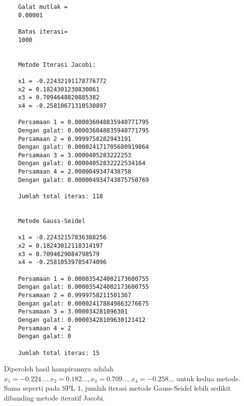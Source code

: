 \documentclass[12pt]{article}
\begin{document}
\begin{enumerate}
{\begin{enumerate}
{\begin{lstlisting}
    Galat mutlak =
    0.00001

    Batas iterasi=
    1000


    Metode Iterasi Jacobi:

    x1 = -0.22432191178776772
    x2 = 0.1824301230830861
    x3 = 0.7094648820885382
    x4 = -0.25810671310530897

    Persamaan 1 = 0.000036048835940771795
    Dengan galat: 0.000036048835940771795
    Persamaan 2 = 0.9999758282943191
    Dengan galat: 0.000024171705680919864
    Persamaan 3 = 3.0000405283222253
    Dengan galat: 0.00004052832222534164
    Persamaan 4 = 2.0000049347438758
    Dengan galat: 0.000004934743875750769

    Jumlah total iteras: 118


    Metode Gauss-Seidel

    x1 = -0.22432157836388256
    x2 = 0.18243012118314197
    x3 = 0.7094629084798579
    x4 = -0.25810539785474096

    Persamaan 1 = 0.000035424002173600755
    Dengan galat: 0.000035424002173600755
    Persamaan 2 = 0.9999758211501367
    Dengan galat: 0.000024178849863276675
    Persamaan 3 = 3.000034281096301
    Dengan galat: 0.00003428109630121412
    Persamaan 4 = 2
    Dengan galat: 0

    Jumlah total iteras: 15
                \end{lstlisting}
                Diperoleh hasil hampirannya adalah $ x_1 = -0.224..., x_2 = 0.182..., x_3 = 0.709..., x_4 = -0.258... $ untuk kedua metode. Sama seperti pada SPL 1, jumlah iterasi metode Gauss-Seidel lebih sedikit dibanding metode iteratif Jacobi.
            }
        \end{enumerate}
    }
\end{enumerate}
\end{document}
